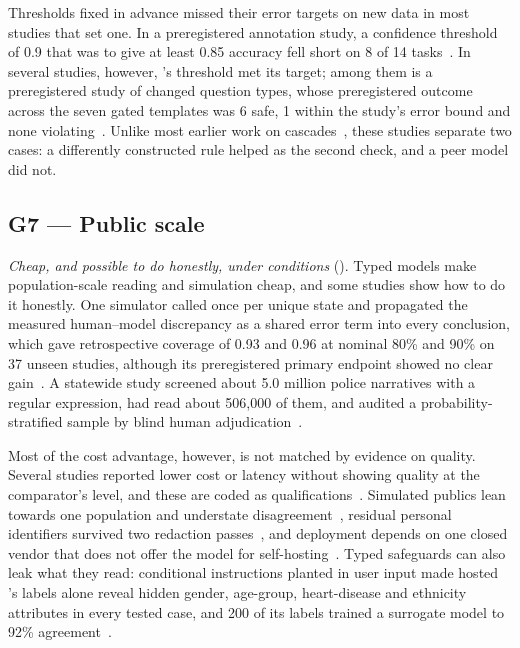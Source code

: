 Thresholds fixed in advance missed their error targets on new data in most studies that set one.
In a preregistered annotation study, a confidence threshold of 0.9 that was to give at least 0.85 accuracy fell short on 8 of 14 tasks~\cite{arx24574}.
In several studies, however, \jev{}'s threshold met its target; among them is a preregistered study of changed question types, whose preregistered outcome across the seven gated templates was 6 safe, 1 within the study's error bound and none violating~\cite{arx33689}.
Unlike most earlier work on cascades~\cite{chen2023frugalgpt,goel2025great}, these studies separate two cases: a differently constructed rule helped as the second check, and a peer model did not.

\subsection{G7 --- Public scale}
\label{sec:g7}

\emph{Cheap, and possible to do honestly, under conditions} (\nTallySeven{}).
Typed models make population-scale reading and simulation cheap, and some studies show how to do it honestly.
One simulator called \jev{} once per unique state and propagated the measured human--model discrepancy as a shared error term into every conclusion, which gave retrospective coverage of 0.93 and 0.96 at nominal 80\% and 90\% on 37 unseen studies, although its preregistered primary endpoint showed no clear gain~\cite{arx27535}.
A statewide study screened about 5.0 million police narratives with a regular expression, had \jev{} read about 506{,}000 of them, and audited a probability-stratified sample by blind human adjudication~\cite{arx00213}.

Most of the cost advantage, however, is not matched by evidence on quality.
Several studies reported lower cost or latency without showing quality at the comparator's level, and these are coded as qualifications~\cite{arx00346,arx01079,arx02046,arx02048}.
Simulated publics lean towards one population and understate disagreement~\cite{arx36399,zen23032384}\zmark{}, residual personal identifiers survived two redaction passes~\cite{arx00213}, and deployment depends on one closed vendor that does not offer the model for self-hosting~\cite{arx28919}.
Typed safeguards can also leak what they read: conditional instructions planted in user input made hosted \jev{}'s labels alone reveal hidden gender, age-group, heart-disease and ethnicity attributes in every tested case, and 200 of its labels trained a surrogate model to 92\% agreement~\cite{arx04985}.

